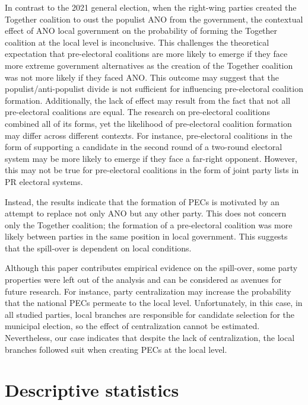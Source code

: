 \documentclass[]{interact}
\theoremstyle{plain}%
\theoremstyle{definition}
\theoremstyle{remark}
\begin{document}
In contrast to the 2021 general election, when the right-wing parties created the Together coalition to oust the populist ANO from the government, the contextual effect of ANO local government on the probability of forming the Together coalition at the local level is inconclusive. This challenges the theoretical expectation that pre-electoral coalitions are more likely to emerge if they face more extreme government alternatives as the creation of the Together coalition was not more likely if they faced ANO. This outcome may suggest that the populist/anti-populist divide is not sufficient for influencing pre-electoral coalition formation. Additionally, the lack of effect may result from the fact that not all pre-electoral coalitions are equal. The research on pre-electoral coalitions combined all of its forms, yet the likelihood of pre-electoral coalition formation may differ across different contexts. For instance, pre-electoral coalitions in the form of supporting a candidate in the second round of a two-round electoral system may be more likely to emerge if they face a far-right opponent. However, this may not be true for pre-electoral coalitions in the form of joint party lists in PR electoral systems. 

Instead, the results indicate that the formation of PECs is motivated by an attempt to replace not only ANO but any other party. This does not concern only the Together coalition; the formation of a pre-electoral coalition was more likely between parties in the same position in local government. This suggests that the spill-over is dependent on local conditions. 

Although this paper contributes empirical evidence on the spill-over, some party properties were left out of the analysis and can be considered as avenues for future research. For instance, party centralization may increase the probability that the national PECs permeate to the local level. Unfortunately, in this case, in all studied parties, local branches are responsible for candidate selection for the municipal election, so the effect of centralization cannot be estimated. Nevertheless, our case indicates that despite the lack of centralization, the local branches followed suit when creating PECs at the local level. 




\newpage
\appendix

\section{Descriptive statistics}
\end{document}
